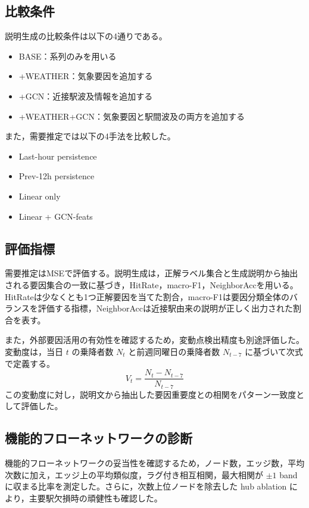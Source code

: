 \documentclass[technicalreport]{ieicej}
\begin{document}
\subsection{比較条件}
説明生成の比較条件は以下の4通りである。
\begin{itemize}
\item BASE：系列のみを用いる
\item +WEATHER：気象要因を追加する
\item +GCN：近接駅波及情報を追加する
\item +WEATHER+GCN：気象要因と駅間波及の両方を追加する
\end{itemize}

また，需要推定では以下の4手法を比較した。
\begin{itemize}
\item Last-hour persistence
\item Prev-12h persistence
\item Linear only
\item Linear + GCN-feats
\end{itemize}

\subsection{評価指標}
需要推定はMSEで評価する。説明生成は，正解ラベル集合と生成説明から抽出される要因集合の一致に基づき，HitRate，macro-F1，NeighborAccを用いる。HitRateは少なくとも1つ正解要因を当てた割合，macro-F1は要因分類全体のバランスを評価する指標，NeighborAccは近接駅由来の説明が正しく出力された割合を表す。

また，外部要因活用の有効性を確認するため，変動点検出精度も別途評価した。変動度は，当日 $t$ の乗降者数 $N_t$ と前週同曜日の乗降者数 $N_{t-7}$ に基づいて次式で定義する。
\begin{equation}
V_t=\frac{N_t-N_{t-7}}{N_{t-7}}
\label{eq:vt}
\end{equation}
この変動度に対し，説明文から抽出した要因重要度との相関をパターン一致度として評価した。

\subsection{機能的フローネットワークの診断}
機能的フローネットワークの妥当性を確認するため，ノード数，エッジ数，平均次数に加え，エッジ上の平均類似度，ラグ付き相互相関，最大相関が $\pm1$ band に収まる比率を測定した。さらに，次数上位ノードを除去した hub ablation により，主要駅欠損時の頑健性も確認した。
\end{document}
